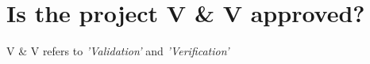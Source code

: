 \section{Is the project V \& V approved?}
  V \& V refers to \textit{'Validation'} and \textit{'Verification'}

\newpage